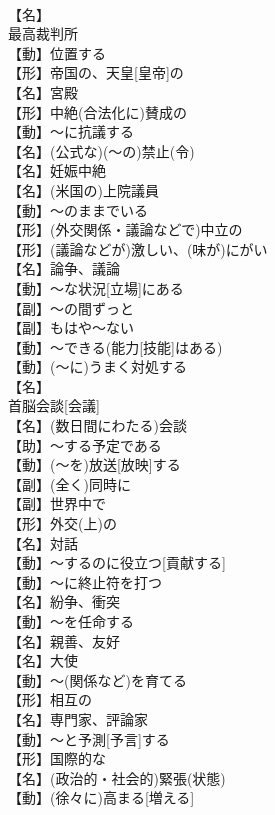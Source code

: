 \documentclass[8pt]{extreport}
\begin{document}
\begin{CJK}{UTF8}{min}
\\	【名】
\\	最高裁判所
\\	【動】位置する
\\	【形】帝国の、天皇[皇帝]の
\\	【名】宮殿
\\	【形】中絶(合法化に)賛成の
\\	【動】～に抗議する
\\	【名】(公式な)(～の)禁止(令)
\\	【名】妊娠中絶
\\	【名】(米国の)上院議員
\\	【動】～のままでいる
\\	【形】(外交関係・議論などで)中立の
\\	【形】(議論などが)激しい、(味が)にがい
\\	【名】論争、議論
\\	【動】～な状況[立場]にある
\\	【副】～の間ずっと
\\	【副】もはや～ない
\\	【動】～できる(能力[技能]はある)
\\	【動】(～に)うまく対処する
\\	【名】
\\	首脳会談[会議]
\\	【名】(数日間にわたる)会談
\\	【助】～する予定である
\\	【動】(～を)放送[放映]する
\\	【副】(全く)同時に
\\	【副】世界中で
\\	【形】外交(上)の
\\	【名】対話
\\	【動】～するのに役立つ[貢献する]
\\	【動】～に終止符を打つ
\\	【名】紛争、衝突
\\	【動】～を任命する
\\	【名】親善、友好
\\	【名】大使
\\	【動】～(関係など)を育てる
\\	【形】相互の
\\	【名】専門家、評論家
\\	【動】～と予測[予言]する
\\	【形】国際的な
\\	【名】(政治的・社会的)緊張(状態)
\\	【動】(徐々に)高まる[増える]

\end{CJK}
\end{document}

